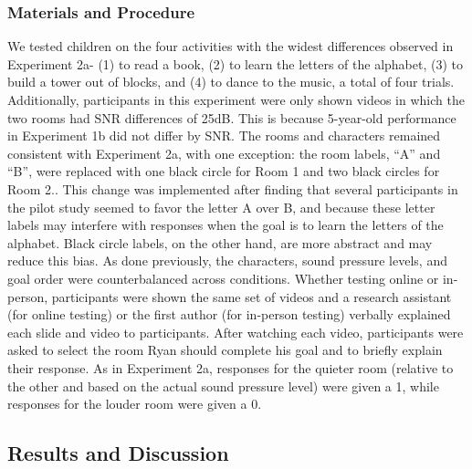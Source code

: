 \documentclass[10pt, letterpaper]{article}
\begin{document}
\hypertarget{materials-and-procedure-3}{%
\subsubsection{Materials and
Procedure}\label{materials-and-procedure-3}}

We tested children on the four activities with the widest differences
observed in Experiment 2a- (1) to read a book, (2) to learn the letters
of the alphabet, (3) to build a tower out of blocks, and (4) to dance to
the music, a total of four trials. Additionally, participants in this
experiment were only shown videos in which the two rooms had SNR
differences of 25dB. This is because 5-year-old performance in
Experiment 1b did not differ by SNR. The rooms and characters remained
consistent with Experiment 2a, with one exception: the room labels,
``A'' and ``B'', were replaced with one black circle for Room 1 and two
black circles for Room 2.. This change was implemented after finding
that several participants in the pilot study seemed to favor the letter
A over B, and because these letter labels may interfere with responses
when the goal is to learn the letters of the alphabet. Black circle
labels, on the other hand, are more abstract and may reduce this bias.
As done previously, the characters, sound pressure levels, and goal
order were counterbalanced across conditions. Whether testing online or
in-person, participants were shown the same set of videos and a research
assistant (for online testing) or the first author (for in-person
testing) verbally explained each slide and video to participants. After
watching each video, participants were asked to select the room Ryan
should complete his goal and to briefly explain their response. As in
Experiment 2a, responses for the quieter room (relative to the other and
based on the actual sound pressure level) were given a 1, while
responses for the louder room were given a 0.

\hypertarget{results-and-discussion-3}{%
\subsection{\texorpdfstring{\textbf{Results and
Discussion}}{Results and Discussion}}\label{results-and-discussion-3}}
\end{document}
